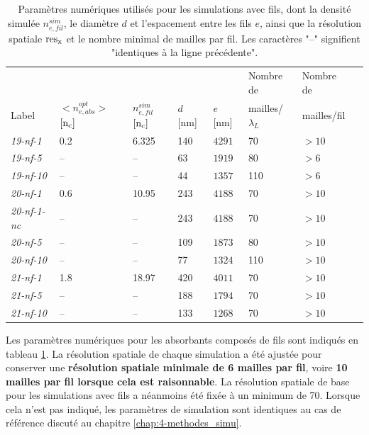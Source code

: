 \begin{refsection}
\begin{table}
    \centering
    \begin{tabular}{ | l | l | l | l | l | l | l | l |}
    \hline
                        &                                   &                               &           &
                & Nombre de             & Nombre de \\
    Label               & $<n_{e,abs}^{opt}>$ $\rm [n_c]$   & $n_{e,fil}^{sim}$ $\rm [n_c]$ & $d$ [nm] & $e$ [nm]    & mailles/$\lambda_L$   & mailles/fil\\
    \hline
    \textit{19-nf-1}    & 0.2       & 6.325 & 140   & $4291$& 70    & $>10$ \\
    \textit{19-nf-5}    & --        & --    & 63    & $1919$& 80    & $>6$  \\
    \textit{19-nf-10}   & --        & --    & 44    & $1357$& 110   & $>6$  \\
    \textit{20-nf-1}    & 0.6       & 10.95 & 243   & $4188$& 70    & $>10$ \\
    \textit{20-nf-1-nc} & --        & --    & 243   & $4188$& 70    & $>10$ \\
    \textit{20-nf-5}    & --        & --    & 109   & $1873$& 80    & $>10$ \\
    \textit{20-nf-10}   & --        & --    & 77    & $1324$& 110   & $>10$ \\
    \textit{21-nf-1}    & 1.8       & 18.97 & 420   & $4011$& 70    & $>10$ \\
    \textit{21-nf-5}    & --        & --    & 188   & $1794$& 70    & $>10$ \\
    \textit{21-nf-10}   & --        & --    & 133   & $1268$& 70    & $>10$ \\
    \hline
   \end{tabular}
    \caption{Paramètres numériques utilisés pour les simulations avec fils, dont la densité simulée $n_{e,fil}^{sim}$, le diamètre $d$ et l'espacement entre les fils $e$, ainsi que la résolution spatiale $\rm res_x$ et le nombre minimal de mailles par fil. Les caractères "--" signifient "identiques à la ligne précédente".}
    \label{tab:62-parametres_simu}
\end{table}

Les paramètres numériques pour les absorbants composés de fils sont indiqués en tableau \ref{tab:62-parametres_simu}. La résolution spatiale de chaque simulation a été ajustée pour conserver une \textbf{résolution spatiale minimale de 6 mailles par fil}, voire \textbf{10 mailles par fil lorsque cela est raisonnable}. La résolution spatiale de base pour les simulations avec fils a néanmoins été fixée à un minimum de 70. Lorsque cela n'est pas indiqué, les paramètres de simulation sont identiques au cas de référence discuté au chapitre \ref{chap:4-methodes_simu}.


\end{refsection}
